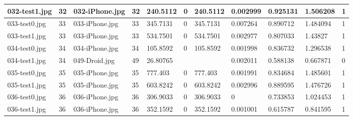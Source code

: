 \begin{landscape}
\begin{longtable}{|p{2cm}|p{1cm}|p{2cm}|p{1cm}|p{2cm}|p{1cm}|p{2cm}|p{2cm}|p{2cm}|p{2cm}|p{1cm}|}
		032-test1.jpg   & 32               & 032-iPhone.jpg        & 32                          & 240.5112              & 0                       & 240.5112                   & 0.002999              & 0.925131              & 1.506208                 & 1                \\ \hline
		033-test0.jpg   & 33               & 033-iPhone.jpg        & 33                          & 345.7131              & 0                       & 345.7131                   & 0.007264              & 0.890712              & 1.484094                 & 1                \\ \hline
		033-test1.jpg   & 33               & 033-iPhone.jpg        & 33                          & 534.7501              & 0                       & 534.7501                   & 0.002977              & 0.807033              & 1.43827                  & 1                \\ \hline
		034-test0.jpg   & 34               & 034-iPhone.jpg        & 34                          & 105.8592              & 0                       & 105.8592                   & 0.001998              & 0.836732              & 1.296538                 & 1                \\ \hline
		034-test1.jpg   & 34               & 049-Droid.jpg         & 49                          & 26.80765              &                         &                            & 0.002011              & 0.588138              & 0.667871                 & 0                \\ \hline
		035-test0.jpg   & 35               & 035-iPhone.jpg        & 35                          & 777.403               & 0                       & 777.403                    & 0.001991              & 0.834684              & 1.485601                 & 1                \\ \hline
		035-test1.jpg   & 35               & 035-iPhone.jpg        & 35                          & 603.8242              & 0                       & 603.8242                   & 0.002996              & 0.889595              & 1.476726                 & 1                \\ \hline
		036-test0.jpg   & 36               & 036-iPhone.jpg        & 36                          & 306.9033              & 0                       & 306.9033                   & 0                     & 0.733853              & 1.024453                 & 1                \\ \hline
		036-test1.jpg   & 36               & 036-iPhone.jpg        & 36                          & 352.1592              & 0                       & 352.1592                   & 0.001001              & 0.615787              & 0.841595                 & 1                \\ \hline

\end{longtable}
\end{landscape}
